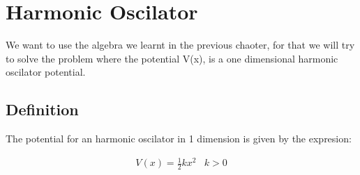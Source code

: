 \setchapterpreamble[u]{\margintoc}
\chapter{Harmonic Oscilator}

We want to use the algebra we learnt in the previous chaoter, for that we will try to solve the problem where the potential V(x), is a one dimensional harmonic oscilator potential.

\section{Definition}

The potential for an harmonic oscilator in 1 dimension is given by the expresion:

\begin{equation}
  \begin{array}{cc}
    V(x) = \frac{1}{2} k x^2 & k > 0
  \end{array}
\end{equation}
